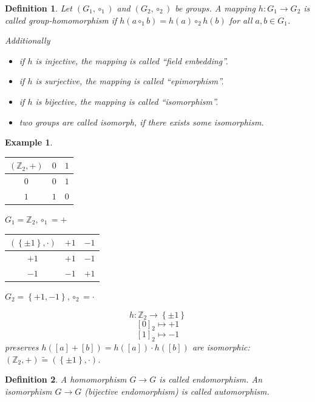 \documentclass[a4paper,landscape,twocolumn]{article}
\newcommand\set[1]{\left\{#1\right\}}
\newtheorem{defi}{Definition}[section]
\newtheorem{ex}{Example}[section]
\begin{document}
\begin{defi}
  Let $(G_1, \circ_1)$ and $(G_2, \circ_2)$ be groups. A mapping $h: G_1 \rightarrow G_2$
  is called group-homomorphism if $h(a \circ_1 b) = h(a) \circ_2 h(b)$ for all $a, b \in G_1$.

  Additionally
  \begin{itemize}
    \item if $h$ is injective, the mapping is called \enquote{field embedding}.
    \item if $h$ is surjective, the mapping is called \enquote{epimorphism}.
    \item if $h$ is bijective, the mapping is called \enquote{isomorphism}.
    \item two groups are called isomorph, if there exists some isomorphism.
  \end{itemize}
\end{defi}

\begin{ex}
  \begin{tabular}{c|cc}
    $(\mathbb Z_2, +)$ & $0$ & $1$ \\
  \hline
                   $0$ & $0$ & $1$ \\
                   $1$ & $1$ & $0$
  \end{tabular}
  $G_1 = \mathbb Z_2, \circ_1 = +$
  \begin{tabular}{c|cc}
    $(\set{\pm 1}, \cdot)$ & $+1$ & $-1$ \\
  \hline
                      $+1$ & $+1$ & $-1$ \\
                      $-1$ & $-1$ & $+1$
  \end{tabular}
  $G_2 = \set{+1, -1}, \circ_2 = \cdot$

  \[ h: \mathbb Z_2 \rightarrow \set{\pm 1} \]
  \[ [0]_2 \mapsto +1 \]
  \[ [1]_2 \mapsto -1 \]
  preserves $h([a] + [b]) = h([a]) \cdot h([b])$ are isomorphic: $(\mathbb{Z}_2, +) \tilde{=} (\set{\pm 1}, \cdot)$.
\end{ex}

\begin{defi}
  A homomorphism $G \rightarrow G$ is called \emph{endomorphism}.
  An isomorphism $G \rightarrow G$ (bijective endomorphism) is called \emph{automorphism}.
\end{defi}
\end{document}
